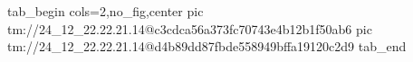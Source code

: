  
 
 
 
 

\qqSecOrig


\ifcmt
  tab_begin cols=2,no_fig,center
    pic tm://24_12_22.22.21.14@c3cdca56a373fc70743e4b12b1f50ab6
    pic tm://24_12_22.22.21.14@d4b89dd87fbde558949bffa19120c2d9
  tab_end
\fi

